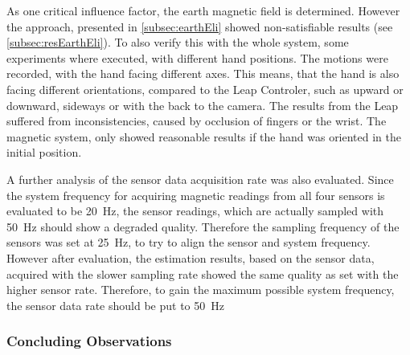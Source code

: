 As one critical influence factor, the earth magnetic field is determined. However the approach, presented in \ref{subsec:earthEli} showed non-satisfiable results (see \ref{subsec:resEarthEli}). To also verify this with the whole system, some experiments where executed, with different hand positions. The motions were recorded, with the hand facing different axes. This means, that the hand is also facing different orientations, compared to the Leap Controler, such as upward or downward, sideways or with the back to the camera. The results from the Leap suffered from inconsistencies, caused by occlusion of fingers or the wrist. The magnetic system, only showed reasonable results if the hand was oriented in the initial position.

A further analysis of the sensor data acquisition rate was also evaluated. Since the system frequency for acquiring magnetic readings from all four sensors is evaluated to be \SI{20}{\Hz}, the sensor readings, which are actually sampled with \SI{50}{\Hz} should show a degraded quality. Therefore the sampling frequency of the sensors was set at \SI{25}{\Hz}, to try to align the sensor and system frequency. However after evaluation, the estimation results, based on the sensor data, acquired with the slower sampling rate showed the same quality as set with the higher sensor rate. Therefore, to gain the maximum possible system frequency, the sensor data rate should be put to \SI{50}{\Hz}


\subsubsection{Concluding Observations}

